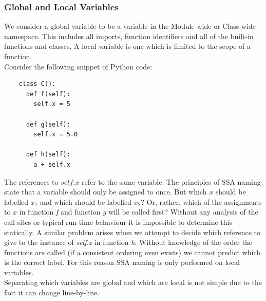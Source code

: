 \documentclass[12pt, titlepage]{article}
\begin{document}
\subsubsection{Global and Local Variables}
We consider a global variable to be a variable in the Module-wide or Class-wide namespace. This includes all imports, function identifiers and all of the built-in functions and classes. A local variable is one which is limited to the scope of a function. \\
Consider the following snippet of Python code:
\begin{lstlisting}
    class C():
      def f(self):
        self.x = 5
     
      def g(self):
        self.x = 5.0         
        
      def h(self):
        a + self.x 
\end{lstlisting}
The references to $self.x$ refer to the same variable. The principles of SSA naming state that a variable should only be assigned to once. But which $x$ should be labelled $x_1$ and which should be labelled $x_2$? Or, rather, which of the assignments to $x$ in function \textit{f} and function \textit{g} will be called first? Without any analysis of the call sites or typical run-time behaviour it is impossible to determine this statically. A similar problem arises when we attempt to decide which reference to give to the instance of \textit{self.x} in function \textit{h}. Without knowledge of the order the functions are called (if a consistent ordering even exists) we cannot predict which is the correct label. For this reason SSA naming is only performed on local variables. \\
\indent Separating which variables are global and which are local is not simple due to the fact it can change line-by-line.
\end{document}
